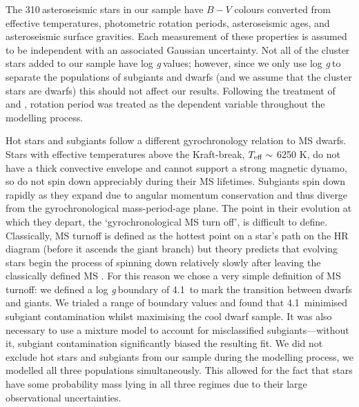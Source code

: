 \documentclass[11pt,preprint]{aastex}
\newcommand{\logg}{log \emph{g}}
\newcommand{\nastero}{310}
\newcommand{\subcut}{4.1~}
\begin{document}
The \nastero$~$asteroseismic stars in our sample have $B-V$ colours converted
from effective temperatures, photometric rotation periods,
asteroseismic ages, and asteroseismic surface gravities.
Each measurement of these properties is assumed to be independent with an
associated Gaussian uncertainty.
Not all of the cluster stars added to our sample have \logg$~$values; however,
since we only use \logg$~$to separate the populations of subgiants and dwarfs
(and we assume that the cluster stars are dwarfs) this should not affect our
results.
Following the treatment of \citet{Barnes2007} and \citet{Mamajek2008},
rotation period was treated as the dependent variable throughout the modelling
process.

Hot stars and subgiants follow a different gyrochronology relation to MS
dwarfs.
Stars with effective temperatures above the Kraft-break, $T_{\rm{eff}}
\sim$ 6250 K, \citep{Kraft1967} do not have a thick convective envelope and
cannot support a strong magnetic dynamo, so do not spin down appreciably
during their MS lifetimes.
Subgiants spin down rapidly as they expand due to angular momentum
conservation and thus diverge from the gyrochronological mass-period-age
plane.
The point in their evolution at which they depart, the `gyrochronological MS
turn off', is difficult to define.
Classically, MS turnoff is defined as the hottest point on a star's path on
the HR diagram (before it ascends the giant branch) but theory predicts that
evolving stars begin the process of spinning down relatively slowly after
leaving the classically defined MS \citep{vanSaders2013}.
For this reason we chose a very simple definition of MS turnoff: we defined
a \logg$~$boundary of \subcut to mark the transition between dwarfs and
giants.
We trialed a range of boundary values and found that \subcut minimised subgiant
contamination whilst maximising the cool dwarf sample.
It was also necessary to use a mixture model to account for misclassified
subgiants---without it, subgiant contamination significantly biased the
resulting fit.
We did not exclude hot stars and subgiants from our sample during the
modelling process, we modelled all three populations simultaneously.
This allowed for the fact that stars have some probability mass lying in all
three regimes due to their large observational uncertainties.
\end{document}
